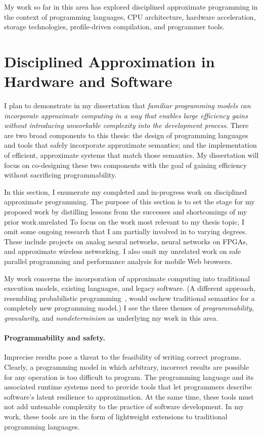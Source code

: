 My work so far in this area has explored disciplined approximate programming
in the context of programming languages, CPU architecture, hardware
acceleration, storage technologies, profile-driven compilation, and programmer
tools.


\section{Disciplined Approximation in Hardware and Software}

I plan to demonstrate in my dissertation that \textit{familiar programming
models can incorporate approximate computing in a way that enables large
efficiency gains without introducing unworkable complexity into the
development process}. There are two broad components to this thesis: the
design of programming languages and tools that safely incorporate approximate
semantics; and the implementation of efficient, approximate systems that match
those semantics. My dissertation will focus on co-designing these two
components with the goal of gaining efficiency without sacrificing
programmability.



In this section, I enumerate my completed and in-progress work on
disciplined approximate programming. The purpose of this section is to set the stage
for my proposed work by distilling lessons from the successes and shortcomings
of my prior work.unrelated 
To focus on the work most relevant to my thesis topic, I omit some ongoing
research that I am partially involved in to varying degrees. These include
projects on analog neural networks, neural networks on FPGAs, and approximate
wireless networking.
I also omit my unrelated work on safe parallel programming and
performance analysis for mobile Web browsers.

My work concerns the incorporation of approximate computing
into traditional execution models, existing
languages, and legacy software.
(A different approach, resembling probabilistic
programming~\cite{church}, would eschew traditional semantics for a completely
new programming model.)
I see the three themes of \emph{programmability},
\emph{granularity}, and \emph{nondeterminism} as underlying my work in this
area.

\paragraph{Programmability and safety.}

Imprecise results pose a threat to the feasibility of writing correct
programs. Clearly, a programming model in which arbitrary, incorrect results
are possible for any operation is too difficult to program. The programming
language and its associated runtime systems need to provide tools that let
programmers describe software's latent resilience to approximation. At the
same time, these tools must not add
untenable
complexity to the practice of software development. In my work, these
tools are in the form of lightweight extensions to traditional programming
languages.

